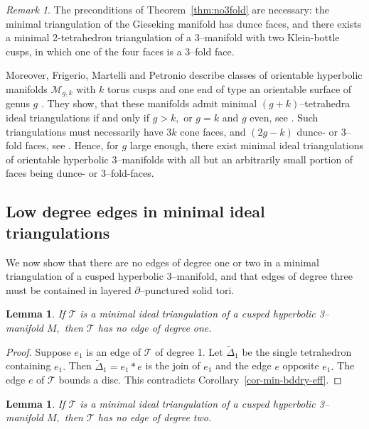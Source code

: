 \documentclass[a4paper]{gtart}
\def\tri{\mathcal{T}}
\def\manifold{M}
\theoremstyle{plain}
\newtheorem{lemma}[theorem]{Lemma}
\theoremstyle{definition}
\theoremstyle{remark}
\newtheorem{remark}[theorem]{Remark}
\numberwithin{equation}{section}
\begin{document}
\begin{remark}
\label{rem:fmp}
The preconditions of Theorem~\ref{thm:no3fold} are necessary: the minimal triangulation of the Gieseking manifold has dunce faces, and there 
exists a minimal 2-tetrahedron triangulation of a 3--manifold with two Klein-bottle cusps, in which one of the four faces is a 3--fold face.

Moreover, Frigerio, Martelli and Petronio describe classes of orientable hyperbolic manifolds $\mathcal{M}_{g,k}$ with $k$ torus cusps and one end of type an orientable surface of genus $g$ \cite{Frigerio-Dehn-2003}. They show, that these manifolds admit minimal $(g+k)$--tetrahedra ideal triangulations if and only if $g>k,$ or $g=k$ and $g$ even, see \cite[Proposition 1.4]{Frigerio-Dehn-2003}. Such triangulations must necessarily have $3k$ cone faces, and $(2g-k)$ dunce- or 3--fold faces, see \cite[Lemma 2.1]{Frigerio-Dehn-2003}. Hence, for $g$ large enough, there exist minimal ideal triangulations of orientable hyperbolic 3--manifolds with all but an arbitrarily small portion of faces being dunce- or 3--fold-faces.
\end{remark}


\subsection{Low degree edges in minimal ideal triangulations}

We now show that there are no edges of degree one or two in a minimal triangulation of a cusped hyperbolic 3--manifold, and that edges of degree three must be contained in layered $\partial$--punctured solid tori.


\begin{lemma} 
  \label{thm:degone}
  If $\tri$ is a minimal ideal triangulation of a cusped hyperbolic 3--manifold $\manifold ,$ then $\tri$ has no edge of degree one.    
\end{lemma}

\begin{proof}  
  Suppose $e_1$ is an edge of $\tri$ of degree 1. Let $\tilde{\Delta}_1$ be the single tetrahedron containing $e_1.$ Then $\tilde{\Delta}_1 = e_1\ast e$ is the join of $e_1$ and the edge $e$ opposite $e_1.$ The edge $e$ of $\tri$ bounds a disc. This contradicts Corollary~\ref{cor-min-bddry-eff}. 
\end{proof} 

\begin{lemma} 
\label{lem:degree two}
  If $\tri$ is a minimal ideal triangulation of a cusped hyperbolic 3--manifold $\manifold ,$ then $\tri$ has no edge of degree two. 
\end{lemma}
\end{document}

